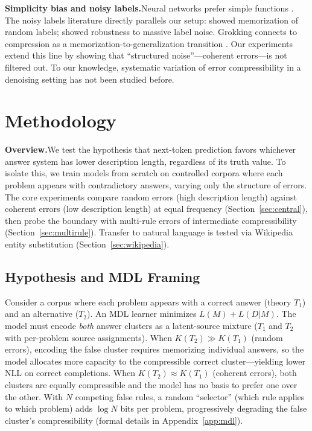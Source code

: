 \documentclass{article}
\begin{document}
\textbf{Simplicity bias and noisy labels.}\quad Neural networks prefer simple functions \citep{valle2019deep,mingard2021sgd,goldblum2024no}. The noisy labels literature directly parallels our setup: \citet{zhang2017understanding} showed memorization of random labels; \citet{rolnick2017deep} showed robustness to massive label noise. Grokking connects to compression as a memorization-to-generalization transition \citep{nanda2023progress,liu2023grokking}. Our experiments extend this line by showing that ``structured noise''---coherent errors---is not filtered out. To our knowledge, systematic variation of error compressibility in a denoising setting has not been studied before.

\section{Methodology}
\label{sec:methodology}

\textbf{Overview.}\quad We test the hypothesis that next-token prediction favors whichever answer system has lower description length, regardless of its truth value. To isolate this, we train models from scratch on controlled corpora where each problem appears with contradictory answers, varying only the structure of errors. The core experiments compare random errors (high description length) against coherent errors (low description length) at equal frequency (Section~\ref{sec:central}), then probe the boundary with multi-rule errors of intermediate compressibility (Section~\ref{sec:multirule}). Transfer to natural language is tested via Wikipedia entity substitution (Section~\ref{sec:wikipedia}).

\subsection{Hypothesis and MDL Framing}
\label{sec:mdl}

Consider a corpus where each problem appears with a correct answer (theory $T_1$) and an alternative ($T_2$). An MDL learner \citep{rissanen1978modeling,grunwald2007minimum} minimizes $L(M) + L(D|M)$. The model must encode \emph{both} answer clusters as a latent-source mixture ($T_1$ and $T_2$ with per-problem source assignments). When $K(T_2) \gg K(T_1)$ (random errors), encoding the false cluster requires memorizing individual answers, so the model allocates more capacity to the compressible correct cluster---yielding lower NLL on correct completions. When $K(T_2) \approx K(T_1)$ (coherent errors), both clusters are equally compressible and the model has no basis to prefer one over the other. With $N$ competing false rules, a random ``selector'' (which rule applies to which problem) adds $\log N$ bits per problem, progressively degrading the false cluster's compressibility (formal details in Appendix~\ref{app:mdl}).
\end{document}
